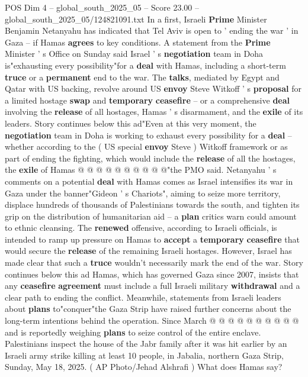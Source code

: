 \begin{textsample}{POS Dim 4 – global\_south\_2025\_05 – Score 23.00 – global\_south\_2025\_05/124821091.txt}  \label{ex:f4_pos_095}
In a first, Israeli \textbf{Prime} Minister Benjamin Netanyahu has indicated that Tel Aviv is open to ' ending the war ' in Gaza -- if Hamas \textbf{agrees} to key conditions.
A statement from the \textbf{Prime} Minister ' s Office on Sunday said Israel ' s \textbf{negotiation} team in Doha is"exhausting every possibility"for a \textbf{deal} with Hamas, including a short-term \textbf{truce} or a \textbf{permanent} end to the war.
The \textbf{talks}, mediated by Egypt and Qatar with US backing, revolve around US \textbf{envoy} Steve Witkoff ' s \textbf{proposal} for a limited hostage \textbf{swap} and \textbf{temporary} \textbf{ceasefire} -- or a comprehensive \textbf{deal} involving the \textbf{release} of all hostages, Hamas ' s disarmament, and the \textbf{exile} of its leaders.
Story continues below this ad"Even at this very moment, the \textbf{negotiation} team in Doha is working to exhaust every possibility for a \textbf{deal} -- whether according to the ( US special \textbf{envoy} Steve ) Witkoff framework or as part of ending the fighting, which would include the \textbf{release} of all the hostages, the \textbf{exile} of Hamas @ @ @ @ @ @ @ @ @ @"the PMO said.
Netanyahu ' s comments on a potential \textbf{deal} with Hamas comes as Israel intensifies its war in Gaza under the banner"Gideon ' s Chariots", aiming to seize more territory, displace hundreds of thousands of Palestinians towards the south, and tighten its grip on the distribution of humanitarian aid -- a \textbf{plan} critics warn could amount to ethnic cleansing.
The \textbf{renewed} offensive, according to Israeli officials, is intended to ramp up pressure on Hamas to \textbf{accept} a \textbf{temporary} \textbf{ceasefire} that would secure the \textbf{release} of the remaining Israeli hostages.
However, Israel has made clear that such a \textbf{truce} wouldn't necessarily mark the end of the war.
Story continues below this ad Hamas, which has governed Gaza since 2007, insists that any \textbf{ceasefire} \textbf{agreement} must include a full Israeli military \textbf{withdrawal} and a clear path to ending the conflict.
Meanwhile, statements from Israeli leaders about \textbf{plans} to"conquer"the Gaza Strip have raised further concerns about the long-term intentions behind the operation.
Since March @ @ @ @ @ @ @ @ @ @ and is reportedly weighing \textbf{plans} to seize control of the entire enclave.
Palestinians inspect the house of the Jabr family after it was hit earlier by an Israeli army strike killing at least 10 people, in Jabalia, northern Gaza Strip, Sunday, May 18, 2025. ( AP Photo/Jehad Alshrafi ) What does Hamas say?

\end{textsample}
